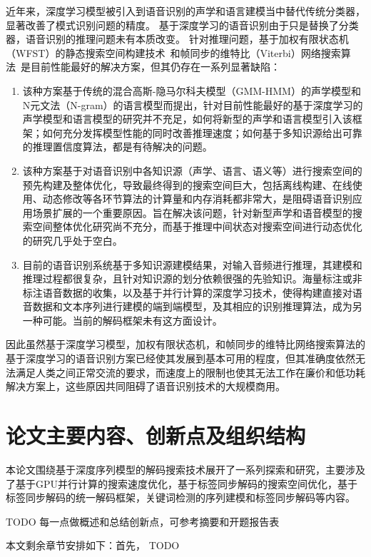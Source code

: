 近年来，深度学习模型被引入到语音识别的声学和语言建模当中替代传统分类器，显著改善了模式识别问题的精度。 基于深度学习的语音识别由于只是替换了分类器，语音识别的推理问题未有本质改变。
针对推理问题，基于加权有限状态机（WFST）的静态搜索空间构建技术~\cite{mohri2002weighted}和帧同步的维特比（Viterbi）网络搜索算法~\cite{forney1973viterbi}是目前性能最好的解决方案，但其仍存在一系列显著缺陷：
\begin{enumerate}
\item 该种方案基于传统的混合高斯-隐马尔科夫模型（GMM-HMM）的声学模型和N元文法（N-gram）的语言模型而提出，针对目前性能最好的基于深度学习的声学模型和语言模型的研究并不充足，如何将新型的声学和语言模型引入该框架；如何充分发挥模型性能的同时改善推理速度；如何基于多知识源给出可靠的推理置信度算法，都是有待解决的问题。
\item 该种方案基于对语音识别中各知识源（声学、语言、语义等）进行搜索空间的预先构建及整体优化，导致最终得到的搜索空间巨大，包括离线构建、在线使用、动态修改等各环节算法的计算量和内存消耗都非常大，是阻碍语音识别应用场景扩展的一个重要原因。旨在解决该问题，针对新型声学和语音模型的搜索空间整体优化研究尚不充分，而基于推理中间状态对搜索空间进行动态优化的研究几乎处于空白。
\item 目前的语音识别系统基于多知识源建模结果，对输入音频进行推理，其建模和推理过程都很复杂，且针对知识源的划分依赖很强的先验知识。海量标注或非标注语音数据的收集，以及基于并行计算的深度学习技术，使得构建直接对语音数据和文本序列进行建模的端到端模型，及其相应的识别推理算法，成为另一种可能。当前的解码框架未有这方面设计。
\end{enumerate}

因此虽然基于深度学习模型，加权有限状态机，和帧同步的维特比网络搜索算法的基于深度学习的语音识别方案已经使其发展到基本可用的程度，但其准确度依然无法满足人类之间正常交流的要求，而速度上的限制也使其无法工作在廉价和低功耗解决方案上，这些原因共同阻碍了语音识别技术的大规模商用。


\section{论文主要内容、创新点及组织结构}
\label{chap:intro0-thesis}
本论文围绕基于深度序列模型的解码搜索技术展开了一系列探索和研究，主要涉及
了基于GPU并行计算的搜索速度优化，基于标签同步解码的搜索空间优化，基于标签同步解码的统一解码框架，关键词检测的序列建模和标签同步解码等内容。

TODO 每一点做概述和总结创新点，可参考摘要和开题报告表

本文剩余章节安排如下：首先，
TODO
